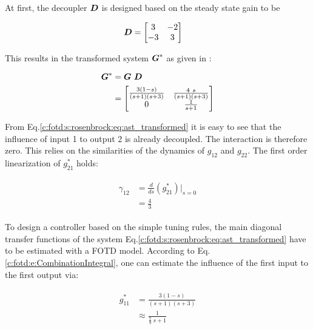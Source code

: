 At first, the decoupler $\mbox{\boldmath$D$}$ is designed based on the steady state gain to be 

\begin{align}
\begin{split}
\mbox{\boldmath$D$} &= \begin{bmatrix}
3 & -2 \\
-3 & 3
\end{bmatrix}
\end{split}
\label{c:fotd:s:rosenbrock:eq:ast_decoupler}
\end{align}

This results in the transformed system $\mbox{\boldmath$G$}^*$ as given in \cite{Astrom2001a}:

\begin{align}
\begin{split}
\mbox{\boldmath$G$}^* &= \mbox{\boldmath$G$} ~\mbox{\boldmath$D$} \\
&= \begin{bmatrix}
\frac{3\left(1-s\right)}{\left(s+1\right)\left(s+3\right)} & \frac{4~s}{\left(s+1\right)\left(s+3\right)} \\
0 &   \frac{1}{s+1}
\end{bmatrix}
\end{split}
\label{c:fotd:s:rosenbrock:eq:ast_transformed}
\end{align}

From Eq.\ref{c:fotd:s:rosenbrock:eq:ast_transformed} it is easy to see that the influence of input 1 to output 2 is already decoupled. The interaction is therefore zero. This relies on the similarities of the dynamics of $g_{12}$ and $g_{22}$. The first order linearization of $g_{21}^*$ holds:

\begin{align}
\begin{split}
\gamma_{12} &= \frac{d}{ds}\left(g_{21}^*\right) |_{s=0} \\
&= \frac{4}{3}
\end{split}
\label{c:fotd:rosenbrock:eq:ast_interaction}
\end{align}

To design a controller based on the simple tuning rules, the main diagonal transfer functions of the system Eq.\ref{c:fotd:s:rosenbrock:eq:ast_transformed} have to be estimated with a FOTD model. According to Eq. \ref{c:fotd:e:CombinationIntegral}, one can estimate the influence of the first input to the first output via:

\begin{align}
\begin{split}
g_{11}^* &= 
\frac{3\left(1-s\right)}{\left(s+1\right)\left(s+3\right)} \\
&\approx \frac{1}{\frac{7}{9}~s + 1}
\end{split}
\label{c:fotd:s:rosenbrock:eq:ast_approx}
\end{align}

